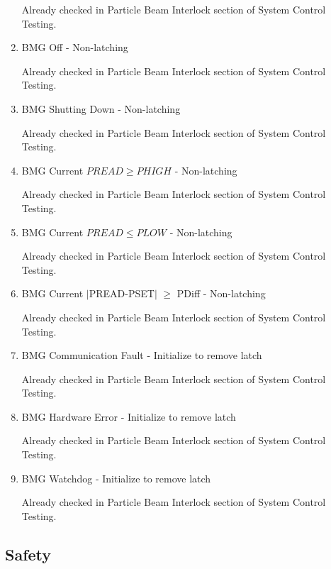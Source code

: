 \documentclass[11pt]{book}		%
\begin{document}
\begin{enumerate}
\color{red}
Already checked in Particle Beam Interlock section of System Control Testing.
\color{black}

 \item BMG Off - Non-latching

\color{red}
Already checked in Particle Beam Interlock section of System Control Testing.
\color{black}

 \item BMG Shutting Down - Non-latching

\color{red}
Already checked in Particle Beam Interlock section of System Control Testing.
\color{black}

 \item BMG Current $PREAD \geq PHIGH$ - Non-latching

\color{red}
Already checked in Particle Beam Interlock section of System Control Testing.
\color{black}

 \item BMG Current $PREAD \leq PLOW$ - Non-latching

\color{red}
Already checked in Particle Beam Interlock section of System Control Testing.
\color{black}

 \item BMG Current $\mid$PREAD-PSET$\mid$  $\geq$ PDiff - Non-latching

\color{red}
Already checked in Particle Beam Interlock section of System Control Testing.
\color{black}

 \item BMG Communication Fault - Initialize to remove latch

\color{red}
Already checked in Particle Beam Interlock section of System Control Testing.
\color{black}

 \item BMG Hardware Error - Initialize to remove latch

\color{red}
Already checked in Particle Beam Interlock section of System Control Testing.
\color{black}

 \item BMG Watchdog - Initialize to remove latch

\color{red}
Already checked in Particle Beam Interlock section of System Control Testing.
\color{black}

\end{enumerate}


\subsection{Safety}
\end{document}
